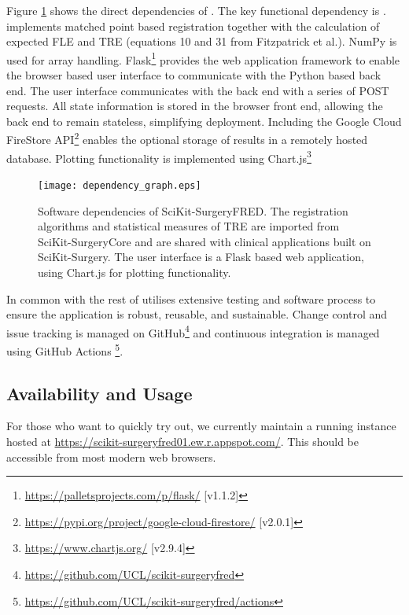 Figure \ref{fig:dependencies} shows the direct dependencies of \fred. The key functional dependency is
\core\cite{matt_clarkson_2020_3965731}. \core implements matched point based registration \cite{Arun1987} together 
with the calculation of expected \gls{FLE} and \gls{TRE}
(equations 10 and 31 from Fitzpatrick et al.\cite{Fitzpatrick1998}). 
{NumPy} \cite{2020NumPy-Array} is used for array handling.
Flask\footnote{\href{https://palletsprojects.com/p/flask/}{https://palletsprojects.com/p/flask/}  [v1.1.2]} provides the web application framework 
to enable the browser based user interface to communicate with the Python based back end. The user
interface communicates with the back end with a series of {POST} requests. All state information is stored in the 
browser front end, allowing the back end to remain stateless, simplifying deployment. 
Including the Google Cloud FireStore API\footnote{\href{https://pypi.org/project/google-cloud-firestore/}{https://pypi.org/project/google-cloud-firestore/} [v2.0.1]} 
enables the optional storage of results in a remotely hosted database. Plotting functionality is implemented
using Chart.js\footnote{\href{https://www.chartjs.org/}{https://www.chartjs.org/} [v2.9.4]}

\begin{figure}
	\begin{center}
	\texttt{[image: dependency\_graph.eps]}
		\caption{\label{fig:dependencies}Software dependencies of SciKit-SurgeryFRED. The registration algorithms and statistical measures of {TRE} are imported from SciKit-SurgeryCore and are shared with clinical applications built on SciKit-Surgery. The user interface is a Flask based web application, using Chart.js for plotting functionality.}
	\end{center}
\end{figure}

In common with the rest of \sksurgery \fred utilises extensive testing and software process \cite{1398621} to 
ensure the application is robust, reusable, and sustainable\cite{VENTERS2018174}. Change control and issue tracking is managed
on GitHub\footnote{\href{https://github.com/UCL/scikit-surgeryfred}{https://github.com/UCL/scikit-surgeryfred}} and continuous integration is managed using
GitHub Actions \footnote{\href{https://github.com/UCL/scikit-surgeryfred/actions}{https://github.com/UCL/scikit-surgeryfred/actions}}.

\subsection{Availability and Usage}
For those who want to quickly try \fred out, we currently maintain a running instance hosted at \href{https://scikit-surgeryfred01.ew.r.appspot.com/}{https://scikit-surgeryfred01.ew.r.appspot.com/}. This should be accessible from most modern web browsers.

